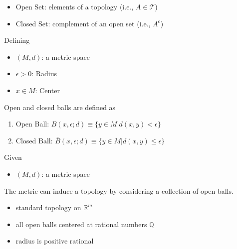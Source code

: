 \begin{definition}

    \begin{itemize}
        \item Open Set: elements of a topology (i.e., $A \in \mathcal{T}$)
        \item Closed Set: complement of an open set (i.e., $A^c$)
    \end{itemize}
    
\end{definition}

\begin{definition}

    Defining
    \begin{itemize}
        \item $(M,d)$: a metric space
        \item $\epsilon > 0$: Radius
        \item $x \in M$: Center
    \end{itemize}
    Open and closed balls are defined as
    \begin{enumerate}
        \item Open Ball: $B(x,\epsilon;d) \equiv \{y \in M | d(x,y) < \epsilon\}$
        \item Closed Ball: $\bar{B}(x,\epsilon;d) \equiv \{y \in M | d(x,y) \le \epsilon\}$
    \end{enumerate}
    
\end{definition}

\begin{definition}
    
    Given
    \begin{itemize}
        \item $(M,d)$: a metric space
    \end{itemize}
    The metric can induce a topology by considering a collection of open balls.

    \begin{example}

        \begin{itemize}
            \item standard topology on $\mathbb{R}^m$
            \item all open balls centered at rational numbers $\mathbb{Q}$
            \item radius is positive rational
        \end{itemize}
    \end{example}

\end{definition}

